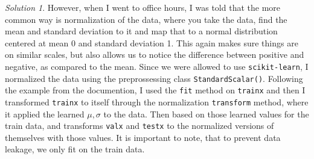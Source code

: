 \documentclass[a4paper,12pt]{article}
\theoremstyle{definition}
\theoremstyle{remark}
\newtheorem*{solution}{Solution}
\begin{document}
\begin{enumerate}
\begin{enumerate}
\begin{solution}
			However, when I went to office hours, I was told that the more common way is normalization of the data, where you take the data, find the mean and standard deviation to it and map that to a normal distribution centered at mean 0 and standard deviation 1. This again makes sure things are on similar scales, but also allows us to notice the difference between positive and negative, as compared to the mean. Since we were allowed to use \texttt{scikit-learn}, I normalized the data using the preprossessing class \texttt{StandardScalar()}. Following the example from the documention, I used the \texttt{fit} method on \texttt{trainx} and then I transformed \texttt{trainx} to itself through the normalization \texttt{transform} method, where it applied the learned $\mu, \sigma$ to the data. Then based on those learned values for the train data, and transforms \texttt{valx} and \texttt{testx} to the normalized versions of themselves with those values. It is important to note, that to prevent data leakage, we only fit on the train data.
			

\end{solution}
\end{enumerate}
\end{enumerate}
\end{document}
